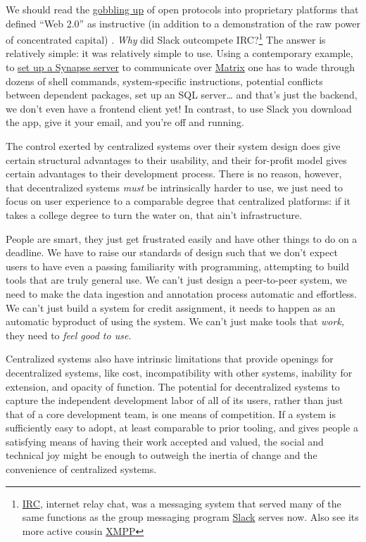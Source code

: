 \documentclass[10pt]{article}
\begin{document}
\begin{multicols}{2}
We should read the
\href{https://en.wikipedia.org/wiki/Embrace,_extend,_and_extinguish}{gobbling
up} of open protocols into proprietary platforms that defined ``Web
2.0'' as instructive (in addition to a demonstration of the raw power of
concentrated capital) \cite{markoffTomorrowWorldWide1996} .
\emph{Why} did Slack outcompete IRC?\footnote{\href{https://en.wikipedia.org/wiki/Internet_Relay_Chat}{IRC},
  internet relay chat, was a messaging system that served many of the
  same functions as the group messaging program
  \href{https://slack.com/}{Slack} serves now. Also see its more active
  cousin \href{https://en.wikipedia.org/wiki/XMPP}{XMPP}} The answer is
relatively simple: it was relatively simple to use. Using a contemporary
example, to
\href{https://matrix-org.github.io/synapse/latest/setup/installation.html}{set
up a Synapse server} to communicate over
\href{https://matrix.org/docs/spec/}{Matrix} one has to wade through
dozens of shell commands, system-specific instructions, potential
conflicts between dependent packages, set up an SQL server\ldots{} and
that's just the backend, we don't even have a frontend client yet! In
contrast, to use Slack you download the app, give it your email, and
you're off and running.

The control exerted by centralized systems over their system design does
give certain structural advantages to their usability, and their
for-profit model gives certain advantages to their development process.
There is no reason, however, that decentralized systems \emph{must} be
intrinsically harder to use, we just need to focus on user experience to
a comparable degree that centralized platforms: if it takes a college
degree to turn the water on, that ain't infrastructure.

People are smart, they just get frustrated easily and have other things
to do on a deadline. We have to raise our standards of design such that
we don't expect users to have even a passing familiarity with
programming, attempting to build tools that are truly general use. We
can't just design a peer-to-peer system, we need to make the data
ingestion and annotation process automatic and effortless. We can't just
build a system for credit assignment, it needs to happen as an automatic
byproduct of using the system. We can't just make tools that
\emph{work,} they need to \emph{feel good to use.}

Centralized systems also have intrinsic limitations that provide
openings for decentralized systems, like cost, incompatibility with
other systems, inability for extension, and opacity of function. The
potential for decentralized systems to capture the independent
development labor of all of its users, rather than just that of a core
development team, is one means of competition. If a system is
sufficiently easy to adopt, at least comparable to prior tooling, and
gives people a satisfying means of having their work accepted and
valued, the social and technical joy might be enough to outweigh the
inertia of change and the convenience of centralized systems.


\end{multicols}
\end{document}

